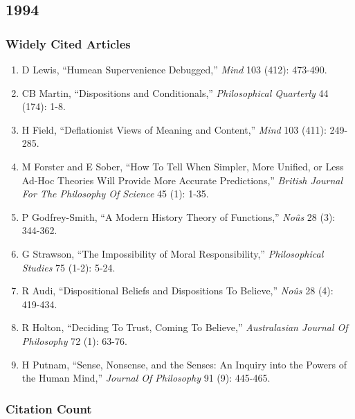 \documentclass[
  10pt,
  letterpaper,
  DIV=11,
  numbers=noendperiod,
  twoside]{scrartcl}
\providecommand{\tightlist}{%
  \setlength{\itemsep}{0pt}\setlength{\parskip}{0pt}}\usepackage{longtable,booktabs,array}
\begin{document}
\newpage

\subsection{1994}\label{sec-s1994}

\subsubsection*{Widely Cited Articles}\label{widely-cited-articles-18}

\begin{enumerate}
\def\labelenumi{\arabic{enumi}.}
\tightlist
\item
  D Lewis, ``Humean Supervenience Debugged,'' \emph{Mind} 103 (412):
  473-490.
\item
  CB Martin, ``Dispositions and Conditionals,'' \emph{Philosophical
  Quarterly} 44 (174): 1-8.
\item
  H Field, ``Deflationist Views of Meaning and Content,'' \emph{Mind}
  103 (411): 249-285.
\item
  M Forster and E Sober, ``How To Tell When Simpler, More Unified, or
  Less Ad-Hoc Theories Will Provide More Accurate Predictions,''
  \emph{British Journal For The Philosophy Of Science} 45 (1): 1-35.
\item
  P Godfrey-Smith, ``A Modern History Theory of Functions,'' \emph{Noûs}
  28 (3): 344-362.
\item
  G Strawson, ``The Impossibility of Moral Responsibility,''
  \emph{Philosophical Studies} 75 (1-2): 5-24.
\item
  R Audi, ``Dispositional Beliefs and Dispositions To Believe,''
  \emph{Noûs} 28 (4): 419-434.
\item
  R Holton, ``Deciding To Trust, Coming To Believe,'' \emph{Australasian
  Journal Of Philosophy} 72 (1): 63-76.
\item
  H Putnam, ``Sense, Nonsense, and the Senses: An Inquiry into the
  Powers of the Human Mind,'' \emph{Journal Of Philosophy} 91 (9):
  445-465.
\end{enumerate}

\subsubsection*{Citation Count}\label{sec-count-1994}
\end{document}
